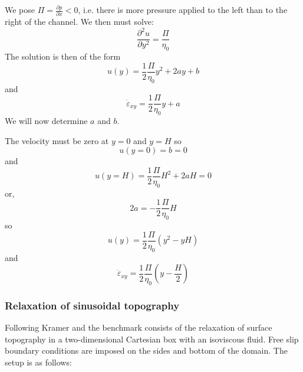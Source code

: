 We pose $\Pi=\frac{\partial p}{\partial x}<0$, i.e. 
there is more pressure applied to the left than to the right of the channel.
We then must solve:
\[
\frac{\partial^2 u}{\partial y^2} = \frac{\Pi}{\eta_0} 
\]
The solution is then of the form
\[
u(y) = \frac{1}{2}\frac{\Pi}{\eta_0} y^2 + 2a y + b
\]
and 
\[
\dot{\varepsilon}_{xy}= \frac{1}{2} \frac{\Pi}{\eta_0}y  + a
\]
We will now determine $a$ and $b$.

The velocity must be zero at $y=0$ and $y=H$ so 
\[
u(y=0)=b=0
\] 
and 
\[
u(y=H)=\frac{1}{2}\frac{\Pi}{\eta_0} H^2 + 2a H =0
\]
or, 
\[
2a=-\frac{1}{2}\frac{\Pi}{\eta_0} H
\]
so 
\begin{equation}
\boxed{
u(y) = \frac{1}{2}\frac{\Pi}{\eta_0} (y^2 - y H)
}
\end{equation}
and 
\begin{equation}
\boxed{
\dot{\varepsilon}_{xy}= \frac{1}{2} \frac{\Pi}{\eta_0} \left(y  - \frac{H}{2} \right)
}
\end{equation}
 


 











\subsubsection{Relaxation of sinusoidal topography}

Following Kramer \etal \cite[Section 3.1.1]{krwd12} and \cite{robh17} 
the benchmark consists of the relaxation of surface topography in a 
two-dimensional Cartesian box with an isoviscous fluid. 
Free slip boundary conditions are imposed on the sides and bottom of the domain.
The setup is as follows:

